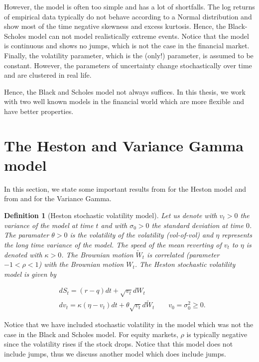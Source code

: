 \documentclass[12pt,a4paper,oneside]{book}
\newtheorem{Definition}{Definition}
\begin{document}
However, the model is often too simple and has a lot of shortfalls. The log returns of empirical data typically do not behave according to a Normal distribution and show most of the time negative skewness and excess kurtosis. Hence, the Black-Scholes model can not model realistically extreme events. Notice that the model is continuous and shows no jumps, which is not the case in the financial market. Finally, the volatility parameter, which is the (only!) parameter, is assumed to be constant. However, the parameters of uncertainty change stochastically over time and are clustered in real life.

Hence, the Black and Scholes model not always suffices. In this thesis, we work with two well known models in the financial world which are more flexible and have better properties. 

\section{The Heston and Variance Gamma model}

In this section, we state some important results from \cite{heston1993closed} for the Heston model and from \cite{madan1998variance} and \cite{wimschoutensvg} for the Variance Gamma. 

\begin{Definition}[Heston stochastic volatility model]
Let us denote with $v_t>0$ the variance of the model at time $t$ and with $\sigma_0>0$ the standard deviation at time $0$. The paramater $\theta>0$ is the volatility of the volatility (vol-of-vol) and $\eta$ represents the long time variance of the model. The speed of the mean reverting of $v_t$ to $\eta$ is denoted with $\kappa>0$. The Brownian motion $\tilde{W}_t $ is correlated (parameter $-1<\rho<1$) with the Brownian motion $W_t $. The Heston stochastic volatility model is given by

\begin{equation}
\begin{aligned}
&dS_t = (r-q) dt + \sqrt{v_t} dW_t \\
&dv_t = \kappa (\eta - v_t) dt + \theta \sqrt{v_t} d \tilde{W}_t   \qquad v_0 = \sigma_0^2 \geq 0.
\end{aligned}
\end{equation}
\end{Definition}


Notice that we have included stochastic volatility in the model which was not the case in the Black and Scholes model. For equity markets, $\rho$ is typically negative since the volatility rises if the stock drops. Notice that this model does not include jumps, thus we discuss another model which does include jumps. 
\end{document}
